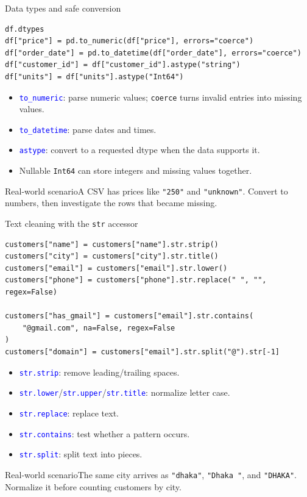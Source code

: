 \documentclass[aspectratio=169,10pt]{beamer}
\newcommand{\scenario}[1]{\begin{block}{Real-world scenario}#1\end{block}}
\newcommand{\method}[1]{\texttt{\textcolor{Blue}{#1}}}
\begin{document}
\begin{frame}[fragile]{Data types and safe conversion}
\begin{lstlisting}
df.dtypes
df["price"] = pd.to_numeric(df["price"], errors="coerce")
df["order_date"] = pd.to_datetime(df["order_date"], errors="coerce")
df["customer_id"] = df["customer_id"].astype("string")
df["units"] = df["units"].astype("Int64")
\end{lstlisting}
\begin{itemize}
\item \method{to\_numeric}: parse numeric values; \texttt{coerce} turns invalid entries into missing values.
\item \method{to\_datetime}: parse dates and times.
\item \method{astype}: convert to a requested dtype when the data supports it.
\item Nullable \texttt{Int64} can store integers and missing values together.
\end{itemize}
\scenario{A CSV has prices like \texttt{"250"} and \texttt{"unknown"}. Convert to numbers, then investigate the rows that became missing.}
\end{frame}

\begin{frame}[fragile]{Text cleaning with the \texttt{str} accessor}
\begin{lstlisting}
customers["name"] = customers["name"].str.strip()
customers["city"] = customers["city"].str.title()
customers["email"] = customers["email"].str.lower()
customers["phone"] = customers["phone"].str.replace(" ", "", regex=False)

customers["has_gmail"] = customers["email"].str.contains(
    "@gmail.com", na=False, regex=False
)
customers["domain"] = customers["email"].str.split("@").str[-1]
\end{lstlisting}
\begin{itemize}
\item \method{str.strip}: remove leading/trailing spaces.
\item \method{str.lower}/\method{str.upper}/\method{str.title}: normalize letter case.
\item \method{str.replace}: replace text.
\item \method{str.contains}: test whether a pattern occurs.
\item \method{str.split}: split text into pieces.
\end{itemize}
\scenario{The same city arrives as \texttt{"dhaka"}, \texttt{"Dhaka "}, and \texttt{"DHAKA"}. Normalize it before counting customers by city.}
\end{frame}
\end{document}
